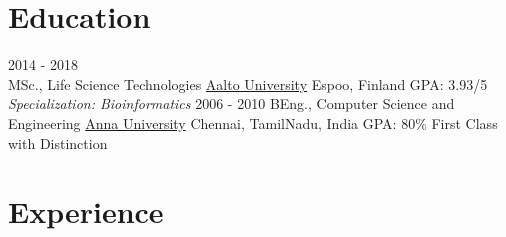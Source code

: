 \documentclass[letterpaper]{twentysecondcv} %
\begin{document}
\makeprofile %

\section{Education}

\begin{twenty} %
	\twentyitem
    	{2014 - 2018 \\}
        {MSc., Life Science Technologies}
        {\href{http://www.aalto.fi/}{Aalto University}}
        {Espoo, Finland}
        {GPA: 3.93/5 \\ \textit{Specialization: Bioinformatics}}
	\twentyitem
    	{2006 - 2010}
        {BEng., Computer Science and Engineering}
        {\href{https://www.annauniv.edu/}{Anna University}}
        {Chennai, TamilNadu, India}
        {GPA: 80\% First Class with Distinction}
\end{twenty}




\section{Experience}
\end{document}
